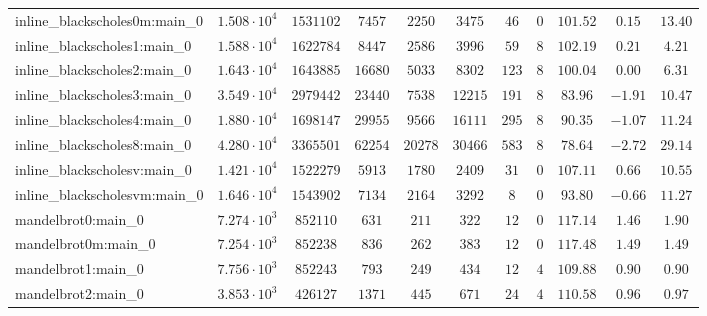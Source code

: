 \begin{tabular}{|l|c|c|c|c|c|c|c|c|c|c|}
inline\_blackscholes0m:main\_0 & $ 1.508 \cdot 10^{4} $ & $ 1531102  $ & $ 7457   $ & $ 2250   $ & $ 3475   $ & $ 46   $ & $ 0    $ & $ 101.52      $ & $ 0.15    $ & $ 13.40   $ \\
inline\_blackscholes1:main\_0  & $ 1.588 \cdot 10^{4} $ & $ 1622784  $ & $ 8447   $ & $ 2586   $ & $ 3996   $ & $ 59   $ & $ 8    $ & $ 102.19      $ & $ 0.21    $ & $ 4.21    $ \\
inline\_blackscholes2:main\_0  & $ 1.643 \cdot 10^{4} $ & $ 1643885  $ & $ 16680  $ & $ 5033   $ & $ 8302   $ & $ 123  $ & $ 8    $ & $ 100.04      $ & $ 0.00    $ & $ 6.31    $ \\
inline\_blackscholes3:main\_0  & $ 3.549 \cdot 10^{4} $ & $ 2979442  $ & $ 23440  $ & $ 7538   $ & $ 12215  $ & $ 191  $ & $ 8    $ & $ 83.96       $ & $ -1.91   $ & $ 10.47   $ \\
inline\_blackscholes4:main\_0  & $ 1.880 \cdot 10^{4} $ & $ 1698147  $ & $ 29955  $ & $ 9566   $ & $ 16111  $ & $ 295  $ & $ 8    $ & $ 90.35       $ & $ -1.07   $ & $ 11.24   $ \\
inline\_blackscholes8:main\_0  & $ 4.280 \cdot 10^{4} $ & $ 3365501  $ & $ 62254  $ & $ 20278  $ & $ 30466  $ & $ 583  $ & $ 8    $ & $ 78.64       $ & $ -2.72   $ & $ 29.14   $ \\
inline\_blackscholesv:main\_0  & $ 1.421 \cdot 10^{4} $ & $ 1522279  $ & $ 5913   $ & $ 1780   $ & $ 2409   $ & $ 31   $ & $ 0    $ & $ 107.11      $ & $ 0.66    $ & $ 10.55   $ \\
inline\_blackscholesvm:main\_0 & $ 1.646 \cdot 10^{4} $ & $ 1543902  $ & $ 7134   $ & $ 2164   $ & $ 3292   $ & $ 8    $ & $ 0    $ & $ 93.80       $ & $ -0.66   $ & $ 11.27   $ \\
mandelbrot0:main\_0            & $ 7.274 \cdot 10^{3} $ & $ 852110   $ & $ 631    $ & $ 211    $ & $ 322    $ & $ 12   $ & $ 0    $ & $ 117.14      $ & $ 1.46    $ & $ 1.90    $ \\
mandelbrot0m:main\_0           & $ 7.254 \cdot 10^{3} $ & $ 852238   $ & $ 836    $ & $ 262    $ & $ 383    $ & $ 12   $ & $ 0    $ & $ 117.48      $ & $ 1.49    $ & $ 1.49    $ \\
mandelbrot1:main\_0            & $ 7.756 \cdot 10^{3} $ & $ 852243   $ & $ 793    $ & $ 249    $ & $ 434    $ & $ 12   $ & $ 4    $ & $ 109.88      $ & $ 0.90    $ & $ 0.90    $ \\
mandelbrot2:main\_0            & $ 3.853 \cdot 10^{3} $ & $ 426127   $ & $ 1371   $ & $ 445    $ & $ 671    $ & $ 24   $ & $ 4    $ & $ 110.58      $ & $ 0.96    $ & $ 0.97    $ \\

\end{tabular}
